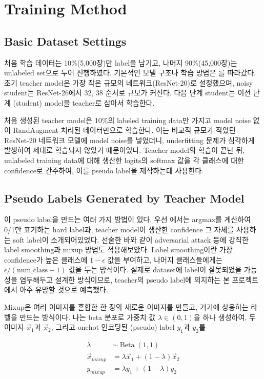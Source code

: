 \section{Training Method}
\subsection{Basic Dataset Settings}
처음 학습 데이터는 10\%(5,000장)만 label을 남기고, 나머지 90\%(45,000장)는 unlabeled set으로 두어 진행하였다. 기본적인 모델 구조나 학습 방법은 \cite{xie2020selftraining}를 따라갔다. 초기 teacher model은 가장 작은 규모의 네트워크(ResNet-20)로 설정했으며, noisy student는 ResNet-26에서 32, 38 순서로 규모가 커진다. 다음 단계 student는 이전 단계 (student) model을 teacher로 삼아서 학습한다.

처음 생성된 teacher model은 10\%의 labeled training data만 가지고 model noise 없이 RandAugment 처리된 데이터만으로 학습한다. 이는 비교적 규모가 작았던 ResNet-20 네트워크 모델에 model noise를 넣었더니, underfitting 문제가 심각하게 발생하여 제대로 학습되지 않았기 떄문이었다. Teacher model의 학습이 끝난 뒤, unlabeled training data에 대해 생산한 logits의 softmax 값을 각 클래스에 대한 confidence로 간주하여, 이를 pseudo label을 제작하는데 사용한다.

\subsection{Pseudo Labels Generated by Teacher Model}
이 pseudo label을 만드는 여러 가지 방법이 있다. 우선 \cite{xie2020selftraining}에서는 argmax를 계산하여 0/1만 표기하는 hard label과, teacher model이 생산한 confidence 그 자체를 사용하는 soft label이 소개되어있었다. 선술한 바와 같이 adversarial attack 등에 강직한 label smoothing과 mixup 방법도 적용해보았다. Label smoothing이란 가장 confidence가 높은 클래스에 $1 - \epsilon$ 값을 부여하고, 나머지 클래스들에게는 $\epsilon / (\text{num\_class} - 1)$ 값을 두는 방식이다. \cite{szegedy2015rethinking} 실제로 dataset에 label이 잘못되었을 가능성을 염두해두고 설계한 방식이므로, teacher의 pseudo label에 의지하는 본 프로젝트에서 아주 유망할 것으로 예측했다.

Mixup은 여러 이미지를 혼합한 한 장의 새로운 이미지를 만들고, 거기에 상응하는 라벨을 만드는 방식이다. \cite{zhang2018mixup} 나는 beta 분포로 가중치 값 $\lambda \in (0, 1)$을 하나 생성하여, 두 이미지 $\vec x_1$과 $\vec x_2$, 그리고 onehot 인코딩된 (pseudo) label $y_1$과 $y_2$를

\begin{align*}
  \lambda &\sim \operatorname{Beta}(1, 1)\\
  \vec x_{mixup} &= \lambda \vec x_1 + (1 - \lambda) \vec x_2 \\
  y_{mixup} &= \lambda y_1 + (1 - \lambda) y_2
\end{align*}

